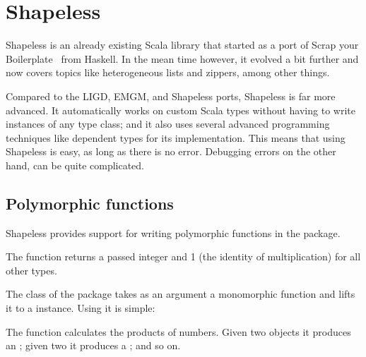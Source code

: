 \section{Shapeless}
\label{shapeless}

Shapeless is an already existing Scala library that started as a port of Scrap your
Boilerplate~\cite{DBLP:conf/tldi/LammelJ03} from Haskell. In the mean time however,
it evolved a bit further and now covers topics like heterogeneous lists and
zippers, among other things.

Compared to the LIGD, EMGM, and Shapeless ports, Shapeless is far more
advanced. It automatically works on custom Scala types without having to
write instances of any type class; and it also uses several advanced programming
techniques like dependent types for its implementation. This means that using
Shapeless is easy, as long as there is no error. Debugging errors on the other
hand, can be quite complicated.

\subsection{Polymorphic functions}
Shapeless provides support for writing polymorphic functions in the
 package.

\begin{example}
  The function  returns a passed integer and 1 (the identity of
  multiplication) for all other types.

  
\end{example}

\begin{example}
  The class \cd{->} of the  package takes as an argument a monomorphic function
  and lifts it to a  instance. Using it is simple:

  
\end{example}

\begin{example}
  The function  calculates the products of numbers. Given two 
  objects it produces an ; given two  it produces a ;
  and so on.
  
\end{example}

